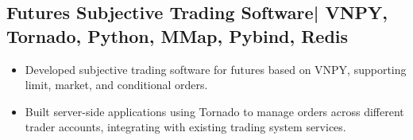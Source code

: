\documentclass{resume}
\begin{document}
\subsection{\textbf{Futures Subjective Trading Software}| VNPY, Tornado, Python, MMap, Pybind, Redis}
\begin{itemize}
\item Developed subjective trading software for futures based on VNPY, supporting limit, market, and conditional orders.
\item Built server-side applications using Tornado to manage orders across different trader accounts, integrating with existing trading system services.
\end{itemize}
\end{document}
